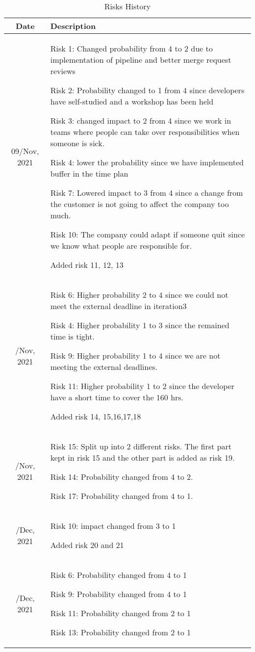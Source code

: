 \begin{table}[H]
\centering
\begin{tabular}{cp{10cm}}
  \toprule
  Date & Description \\
  \midrule
  09/Nov, 2021    & 
 Risk 1: Changed probability from 4 to 2 due to implementation of pipeline and better merge request reviews 

 Risk 2: Probability changed to 1 from 4 since developers have self-studied and a workshop has been held 

 Risk 3: changed impact to 2 from 4 since we work in teams where people can take over responsibilities when someone is sick. 

 Risk 4: lower the probability since we have implemented buffer in the time plan 

 Risk 7: Lowered impact to 3 from 4 since a change from the customer is not going to affect the company too much. 

 Risk 10: The company could adapt if someone quit since we know what people are responsible for. 
    
 Added risk 11, 12, 13  \\
  \addlinespace
  11/Nov, 2021    & 
 Risk 6: Higher probability 2 to 4 since we could not meet the external deadline in iteration3 

 Risk 4: Higher probability 1 to 3 since the remained time is tight. 

 Risk 9: Higher probability 1 to 4 since we are not meeting the external deadlines. 

 Risk 11: Higher probability 1 to 2 since the developer have a short time to cover the 160 hrs. 

Added risk 14, 15,16,17,18  \\
  \addlinespace
  15/Nov, 2021 &
 Risk 15: Split up into 2 different risks. The first part kept in risk 15 and the other part is added as risk 19. 

 Risk 14: Probability changed from 4 to 2. 

 Risk 17: Probability changed from 4 to 1.\\
 \addlinespace
 02/Dec, 2021 &
 Risk 10: impact changed from 3 to 1 

 Added risk 20 and 21 \\
 \addlinespace
 04/Dec, 2021 &
 Risk 6: Probability changed from 4 to 1   
 
 Risk 9: Probability changed from 4 to 1  
 
 Risk 11: Probability changed from 2 to 1  
 
 Risk 13: Probability changed from 2 to 1 \\
  \bottomrule
\end{tabular}
\caption{Risks History}
\label{tab: risk-history}
\end{table}






